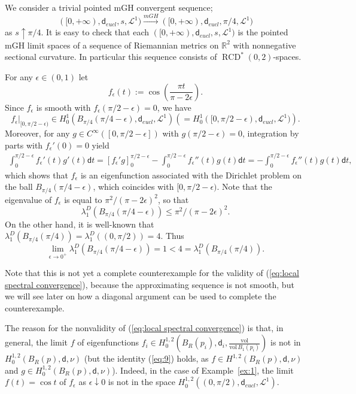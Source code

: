\documentclass[a4paper,11pt,reqno]{article}
\numberwithin{equation}{section}
\theoremstyle{plain}
\theoremstyle{definition}
\theoremstyle{remark}
\newcommand{\dist}{\mathsf{d}}
\DeclareMathOperator{\RCD}{RCD}
\begin{document}
\begin{example}\label{ex:1}
We consider a trivial pointed mGH convergent sequence; 
$$
([0, +\infty), \dist_{eucl}, s, \mathcal{L}^1) \stackrel{mGH}{\to} ([0, +\infty), \dist_{eucl}, \pi/4, \mathcal{L}^1)
$$
as $s \uparrow \pi/4$.
It is easy to check that each $([0, +\infty), \dist_{eucl}, s, \mathcal{L}^1)$ is the pointed mGH limit spaces of a sequence of Riemannian metrics on $\mathbb{R}^2$ with nonnegative sectional curvature. In particular this sequence consists of $\RCD^*(0, 2)$-spaces.

For any $\epsilon \in (0, 1)$ let 
$$
f_{\epsilon}(t):=\cos \left( \frac{\pi t}{\pi-2\epsilon}\right).
$$
Since $f_{\epsilon}$ is smooth with $f_{\epsilon}(\pi/2-\epsilon)=0$, we have
$$
f_{\epsilon}|_{[0, \pi/2-\epsilon)} \in H^1_0(B_{\pi/4}(\pi/4-\epsilon), \dist_{eucl}, \mathcal{L}^1)
\left(=H^1_0([0, \pi/2-\epsilon), \dist_{eucl}, \mathcal{L}^1)\right).
$$
Moreover, for any $g \in C^{\infty}([0, \pi/2-\epsilon])$ with $g(\pi/2-\epsilon)=0$, integration by parts with $f_{\epsilon}'(0)=0$ yield
\begin{align*}
\int_0^{\pi/2-\epsilon}f_{\epsilon}'(t) g'(t)\dist t=\left[ f_{\epsilon}'g\right]_{0}^{\pi/2-\epsilon}-
\int_0^{\pi/2-\epsilon}f_{\epsilon}''(t) g(t) \dist t= -\int_0^{\pi/2-\epsilon}f_{\epsilon}''(t) g(t) \dist t,
\end{align*}
which shows that $f_{\epsilon}$ is an eigenfunction associated with the Dirichlet problem on the ball
$B_{\pi/4}(\pi/4-\epsilon)$, which coincides with $[0, \pi/2-\epsilon)$.
Note that the eigenvalue of $f_{\epsilon}$ is equal to $\pi^2/(\pi-2\epsilon)^2$, so that
$$
\lambda_1^D(B_{\pi/4}(\pi/4-\epsilon)) \le \pi^2/(\pi-2\epsilon)^2.
$$
On the other hand, it is well-known that $\lambda_1^D(B_{\pi/4}(\pi/4))=\lambda_1^D((0, \pi/2))=4$.
Thus 
\begin{equation}\label{eq:2}
\lim_{\epsilon \to 0^+}\lambda_1^D(B_{\pi/4}(\pi/4-\epsilon)) =1<4= \lambda_1^D(B_{\pi/4}(\pi/4)).
\end{equation}
\end{example}

Note that this is not yet a complete counterexample for the validity of (\ref{eq:local spectral convergence}), because the
approximating sequence is not smooth, but we will see later on how a diagonal argument can be used to complete
the counterexample.

The reason for the nonvalidity of (\ref{eq:local spectral convergence}) is that, in general, the limit $f$ of eigenfunctions $f_i \in H^{1, 2}_0(B_R(p_i), \dist_i, \frac{\mathrm{vol}}{\mathrm{vol}\,B_1(p_i)})$ is not in $H^{1, 2}_0(B_R(p), \dist, \nu)$ (but the identity (\ref{eq:9}) holds, as 
$f \in H^{1, 2}(B_R(p), \dist, \nu)$ and $g \in H^{1, 2}_0(B_R(p), \dist, \nu)$).
Indeed, in the case of Example~\ref{ex:1}, the limit $f(t)=\cos t$ of $f_{\epsilon}$ as $\epsilon \downarrow 0$ is not in 
the space $H^{1, 2}_0((0, \pi/2),\dist_{eucl}, \mathcal{L}^1)$.
\end{document}
